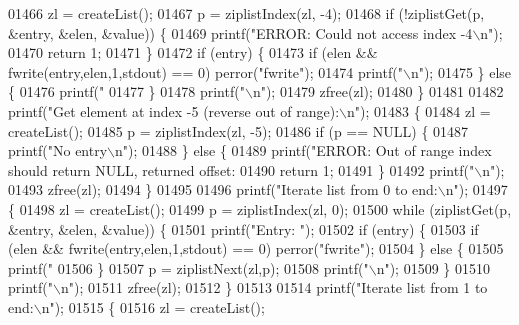 \begin{DoxyCode}
{{{{{{{{{{{{{{{{{{{{01466         zl = createList();
01467         p = ziplistIndex(zl, -4);
01468         \textcolor{keywordflow}{if} (!ziplistGet(p, &entry, &elen, &value)) \{
01469             printf(\textcolor{stringliteral}{"ERROR: Could not access index -4\(\backslash\)n"});
01470             \textcolor{keywordflow}{return} 1;
01471         \}
01472         \textcolor{keywordflow}{if} (entry) \{
01473             \textcolor{keywordflow}{if} (elen && fwrite(entry,elen,1,stdout) == 0) perror(\textcolor{stringliteral}{"fwrite"});
01474             printf(\textcolor{stringliteral}{"\(\backslash\)n"});
01475         \} \textcolor{keywordflow}{else} \{
01476             printf(\textcolor{stringliteral}{"%
01477         \}
01478         printf(\textcolor{stringliteral}{"\(\backslash\)n"});
01479         zfree(zl);
01480     \}
01481 
01482     printf(\textcolor{stringliteral}{"Get element at index -5 (reverse out of range):\(\backslash\)n"});
01483     \{
01484         zl = createList();
01485         p = ziplistIndex(zl, -5);
01486         \textcolor{keywordflow}{if} (p == NULL) \{
01487             printf(\textcolor{stringliteral}{"No entry\(\backslash\)n"});
01488         \} \textcolor{keywordflow}{else} \{
01489             printf(\textcolor{stringliteral}{"ERROR: Out of range index should return NULL, returned offset: %
01490             \textcolor{keywordflow}{return} 1;
01491         \}
01492         printf(\textcolor{stringliteral}{"\(\backslash\)n"});
01493         zfree(zl);
01494     \}
01495 
01496     printf(\textcolor{stringliteral}{"Iterate list from 0 to end:\(\backslash\)n"});
01497     \{
01498         zl = createList();
01499         p = ziplistIndex(zl, 0);
01500         \textcolor{keywordflow}{while} (ziplistGet(p, &entry, &elen, &value)) \{
01501             printf(\textcolor{stringliteral}{"Entry: "});
01502             \textcolor{keywordflow}{if} (entry) \{
01503                 \textcolor{keywordflow}{if} (elen && fwrite(entry,elen,1,stdout) == 0) perror(\textcolor{stringliteral}{"fwrite"});
01504             \} \textcolor{keywordflow}{else} \{
01505                 printf(\textcolor{stringliteral}{"%
01506             \}
01507             p = ziplistNext(zl,p);
01508             printf(\textcolor{stringliteral}{"\(\backslash\)n"});
01509         \}
01510         printf(\textcolor{stringliteral}{"\(\backslash\)n"});
01511         zfree(zl);
01512     \}
01513 
01514     printf(\textcolor{stringliteral}{"Iterate list from 1 to end:\(\backslash\)n"});
01515     \{
01516         zl = createList();
}}}}}}}}}}}}}}}}}}}}}}}
\end{DoxyCode}
